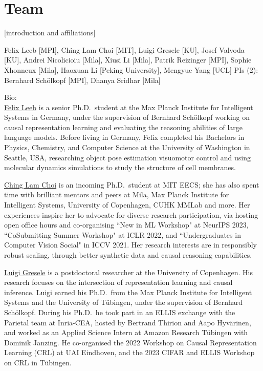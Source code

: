 \documentclass{article}
\begin{document}


\section{Team}

[introduction and affiliations]

Felix Leeb [MPI], Ching Lam Choi [MIT], Luigi Gresele [KU], Josef Valvoda [KU],  Andrei Nicolicioiu [Mila], Xiusi Li [Mila], Patrik Reizinger [MPI], Sophie Xhonneux [Mila],
Haoxuan Li [Peking University], Mengyue Yang [UCL]
PIs (2): Bernhard Schölkopf [MPI], Dhanya Sridhar [Mila]

Bio:\\

\href{https://felixludos.com/}{Felix Leeb} 
is a senior Ph.D.\ student at the Max Planck Institute for Intelligent Systems in Germany, under the supervision of Bernhard Schölkopf working on causal representation learning and evaluating the reasoning abilities of large language models. Before living in Germany, Felix completed his Bachelors in Physics, Chemistry, and Computer Science at the University of Washington in Seattle, USA, researching object pose estimation visuomotor control and using molecular dynamics simulations to study the structure of cell membranes.

\href{https://chinglamchoi.github.io/cchoi/}{Ching Lam Choi} is an incoming Ph.D.\ student at MIT EECS; she has also spent time with brilliant mentors and peers at Mila, Max Planck Institute for Intelligent Systems, University of Copenhagen, CUHK MMLab and more. Her experiences inspire her to advocate for diverse research participation, via hosting open office hours and co-organising ``New in ML Workshop" at NeurIPS 2023, ``CoSubmitting Summer Workshop" at ICLR 2022, and ``Undergraduates in Computer Vision Social" in ICCV 2021. Her research interests are in responsibly robust scaling, through better synthetic data and causal reasoning capabilities.

\href{https://lgresele.github.io/}{Luigi Gresele}  is a postdoctoral researcher at the University of Copenhagen. His research focuses on the intersection of representation learning and causal inference. Luigi earned his Ph.D.\ from the Max Planck Institute for Intelligent Systems and the University of Tübingen, under the supervision of Bernhard Schölkopf. During his Ph.D.\, he took part in an ELLIS exchange with the Parietal team at Inria-CEA, hosted by Bertrand Thirion and Aapo Hyvärinen, and worked as an Applied Science Intern at Amazon Research Tübingen with Dominik Janzing. He co-organised the 2022 Workshop on Causal Representation Learning (CRL) at UAI Eindhoven, and the 2023 CIFAR and ELLIS Workshop on CRL in T\"ubingen.
\end{document}
